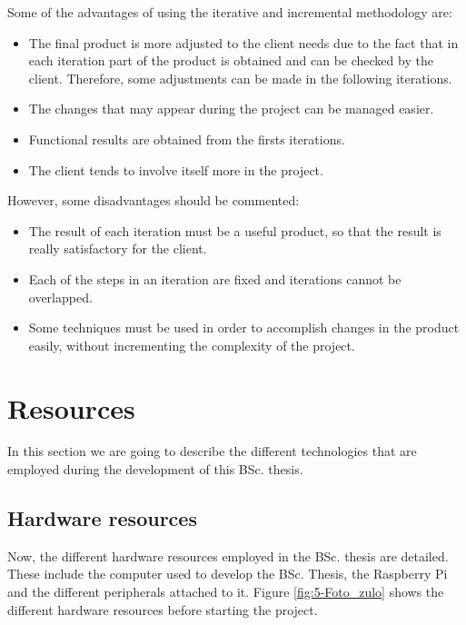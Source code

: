 Some of the advantages of using the iterative and incremental methodology are:
\begin{itemize}
	\item The final product is more adjusted to the client needs due to the fact that in each iteration part of the product is obtained and can be checked by the client. Therefore, some adjustments can be made in the following iterations.
	
	\item The changes that may appear during the project can be managed easier.
	
	\item Functional results are obtained from the firsts iterations.
	
	\item The client tends to involve itself more in the project. 
\end{itemize}

However, some disadvantages should be commented:
\begin{itemize}
	\item The result of each iteration must be a useful product, so that the result is really satisfactory for the client.
	
	\item Each of the steps in an iteration are fixed and iterations cannot be overlapped.
	
	\item Some techniques must be used in order to accomplish changes in the product easily, without incrementing the complexity of the project.
\end{itemize}


\section{Resources}
In this section we are going to describe the different technologies that are employed during the development of this \ac{BSc.} thesis.

\subsection{Hardware resources}
Now, the different hardware resources employed in the \ac{BSc.} thesis are detailed. These include the computer used to develop the \ac{BSc.} Thesis, the Raspberry Pi and the different peripherals attached to it. Figure \ref{fig:5-Foto_zulo} shows the different hardware resources before starting the project.


